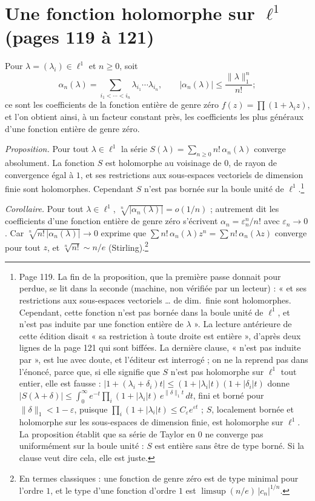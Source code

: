 \documentclass[11pt,a4paper]{article}
\begin{document}
\section*{Une fonction holomorphe sur $\ell^1$ (pages 119 à 121)}

Pour $\lambda = (\lambda_i) \in \ell^1$ et $n \geq 0$, soit
\[
  \alpha_n(\lambda) = \sum_{i_1 < \cdots < i_n} \lambda_{i_1} \cdots \lambda_{i_n},
  \qquad |\alpha_n(\lambda)| \leq \frac{\|\lambda\|_1^n}{n!} ;
\]
ce sont les coefficients de la fonction entière de genre zéro $f(z) =
\prod(1 + \lambda_i z)$, et l'on obtient ainsi, à un facteur constant près,
les coefficients les plus généraux d'une fonction entière de genre zéro.

\emph{Proposition.} Pour tout $\lambda \in \ell^1$ la série $S(\lambda) =
\sum_{n \geq 0} n!\,\alpha_n(\lambda)$ converge absolument. La fonction $S$
est holomorphe au voisinage de $0$, de rayon de convergence égal à $1$, et
ses restrictions aux sous-espaces vectoriels de dimension finie sont
holomorphes. Cependant $S$ n'est pas bornée sur la boule unité de
$\ell^1$.\footnote{Page 119. La fin de la proposition, que la première passe
donnait pour perdue, se lit dans la seconde (machine, non vérifiée par un
lecteur) : « et ses restrictions aux sous-espaces vectoriels … de dim.\
finie sont holomorphes. Cependant, cette fonction n'est pas bornée dans la
boule unité de $\ell^1$, et n'est pas induite par une fonction entière de
$\lambda$ ». La lecture antérieure de cette édition disait « sa restriction
à toute droite est entière », d'après deux lignes de la page 121 qui sont
biffées. La dernière clause, « n'est pas induite par », est lue avec doute,
et l'éditeur est interrogé ; on ne la reprend pas dans l'énoncé, parce que,
si elle signifie que $S$ n'est pas holomorphe sur $\ell^1$ tout entier, elle
est fausse : $|1 + (\lambda_i + \delta_i)t| \leq (1 + |\lambda_i|t)(1 +
|\delta_i|t)$ donne $|S(\lambda + \delta)| \leq \int_0^\infty e^{-t}\prod_i(1
+ |\lambda_i|t)\,e^{\|\delta\|_1 t}\,dt$, fini et borné pour $\|\delta\|_1 <
1 - \varepsilon$, puisque $\prod_i (1 + |\lambda_i|t) \leq
C_\varepsilon e^{\varepsilon t}$ ; $S$, localement bornée et holomorphe sur
les sous-espaces de dimension finie, est holomorphe sur $\ell^1$. La
proposition établit que sa série de Taylor en $0$ ne converge pas
uniformément sur la boule unité : $S$ est entière sans être de type borné.
Si la clause veut dire cela, elle est juste.}

\emph{Corollaire.} Pour tout $\lambda \in \ell^1$, $\sqrt[n]{|\alpha_n(\lambda)|}
= o(1/n)$ ; autrement dit les coefficients d'une fonction entière de genre
zéro s'écrivent $\alpha_n = \varepsilon_n^n/n!$ avec $\varepsilon_n \to 0$. Car
$\sqrt[n]{n!\,|\alpha_n(\lambda)|} \to 0$ exprime que $\sum n!\,\alpha_n(\lambda)
z^n = \sum n!\,\alpha_n(\lambda z)$ converge pour tout $z$, et
$\sqrt[n]{n!} \sim n/e$ (Stirling).\footnote{En termes classiques : une
fonction de genre zéro est de type minimal pour l'ordre $1$, et le type
d'une fonction d'ordre $1$ est $\limsup (n/e)\,|c_n|^{1/n}$.}
\end{document}
